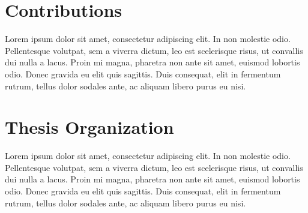 \section{Contributions}
Lorem ipsum dolor sit amet, consectetur adipiscing elit. In non molestie odio. Pellentesque volutpat, sem a viverra dictum, leo est scelerisque risus, ut convallis dui nulla a lacus. Proin mi magna, pharetra non ante sit amet, euismod lobortis odio. Donec gravida eu elit quis sagittis. Duis consequat, elit in fermentum rutrum, tellus dolor sodales ante, ac aliquam libero purus eu nisi. 

\section{Thesis Organization}
Lorem ipsum dolor sit amet, consectetur adipiscing elit. In non molestie odio. Pellentesque volutpat, sem a viverra dictum, leo est scelerisque risus, ut convallis dui nulla a lacus. Proin mi magna, pharetra non ante sit amet, euismod lobortis odio. Donec gravida eu elit quis sagittis. Duis consequat, elit in fermentum rutrum, tellus dolor sodales ante, ac aliquam libero purus eu nisi. 
